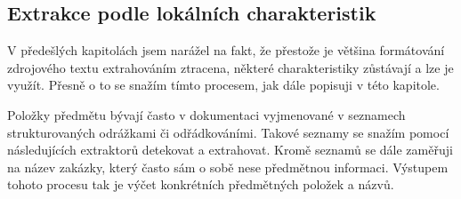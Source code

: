 \documentclass[thesis=M,czech]{FITthesis}[2019/12/23]
\begin{document}
\subsection{Extrakce podle lokálních charakteristik}
\label{sec:local_stats_extraction}

V předešlých kapitolách jsem narážel na fakt, že přestože je většina formátování zdrojového textu extrahováním ztracena, některé charakteristiky zůstávají a lze je využít. Přesně o to se snažím tímto procesem, jak dále popisuji v této kapitole.

Položky předmětu bývají často v dokumentaci vyjmenované v seznamech strukturovaných odrážkami či odřádkováními. Takové seznamy se snažím pomocí následujících extraktorů detekovat a extrahovat. Kromě seznamů se dále zaměřuji na název zakázky, který často sám o sobě nese předmětnou informaci. Výstupem tohoto procesu tak je výčet konkrétních předmětných položek a názvů.
\end{document}
